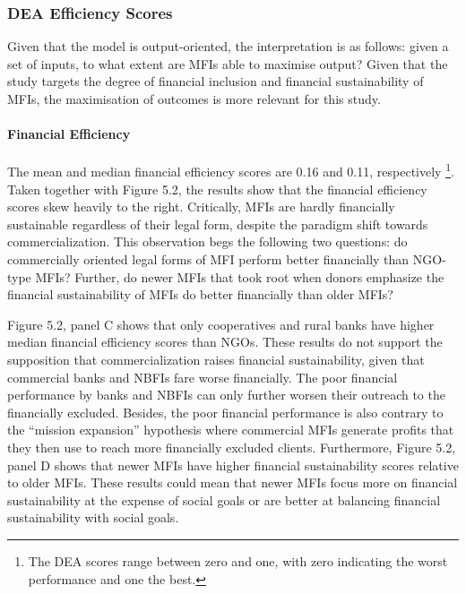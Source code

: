 \documentclass[a4paper, nobind]{templates/ociamthesis}
\begin{document}
\hypertarget{dea-efficiency-scores}{%
\subsubsection{DEA Efficiency Scores}\label{dea-efficiency-scores}}

Given that the model is output-oriented, the interpretation is as follows: given a set of inputs, to what extent are MFIs able to maximise output? Given that the study targets the degree of financial inclusion and financial sustainability of MFIs, the maximisation of outcomes is more relevant for this study.

\hypertarget{financial-efficiency}{%
\paragraph{Financial Efficiency}\label{financial-efficiency}}

The mean and median financial efficiency scores are 0.16 and 0.11, respectively \footnote{The DEA scores range between zero and one, with zero indicating the worst performance and one the best.}. Taken together with Figure 5.2, the results show that the financial efficiency scores skew heavily to the right. Critically, MFIs are hardly financially sustainable regardless of their legal form, despite the paradigm shift towards commercialization. This observation begs the following two questions: do commercially oriented legal forms of MFI perform better financially than NGO-type MFIs? Further, do newer MFIs that took root when donors emphasize the financial sustainability of MFIs do better financially than older MFIs?

Figure 5.2, panel C shows that only cooperatives and rural banks have higher median financial efficiency scores than NGOs. These results do not support the supposition that commercialization raises financial sustainability, given that commercial banks and NBFIs fare worse financially. The poor financial performance by banks and NBFIs can only further worsen their outreach to the financially excluded. Besides, the poor financial performance is also contrary to the ``mission expansion'' hypothesis where commercial MFIs generate profits that they then use to reach more financially excluded clients. Furthermore, Figure 5.2, panel D shows that newer MFIs have higher financial sustainability scores relative to older MFIs. These results could mean that newer MFIs focus more on financial sustainability at the expense of social goals or are better at balancing financial sustainability with social goals.
\end{document}
